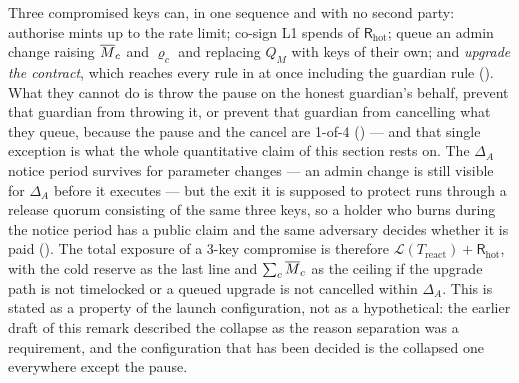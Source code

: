 \begin{remark}
\label{rem:sets-coincide}
Three compromised keys can, in one sequence and with no second party: authorise mints up to the rate
limit; co-sign L1 spends of $\mathsf{R}_{\mathrm{hot}}$; queue an admin change raising $\overline{M}_{c}$ and
$\varrho_c$ and replacing $Q_M$ with keys of their own; and \emph{upgrade the contract}, which
reaches every rule in  at once including the guardian rule
(). What they cannot do is throw the pause on the honest guardian's behalf,
prevent that guardian from throwing it, or prevent that guardian from cancelling what they queue,
because the pause and the cancel are 1-of-4 () --- and
that single exception is what the whole quantitative claim of this section rests on. The $\Delta_A$
notice period survives for parameter changes --- an admin change is still visible for $\Delta_A$
before it executes --- but the exit it is supposed to protect runs through a release quorum
consisting of the same three keys, so a holder who burns during the notice period has a public claim
and the same adversary decides whether it is paid (). The total exposure of a
3-key compromise is therefore $\mathcal{L}(T_{\mathrm{react}}) + \mathsf{R}_{\mathrm{hot}}$, with
the cold reserve as the last line and $\sum_c \overline{M}_{c}$ as the ceiling if the upgrade path is not
timelocked or a queued upgrade is not cancelled within $\Delta_A$. This is stated as a property of
the launch configuration, not as a hypothetical: the
earlier draft of this remark described the collapse as the reason separation was a requirement, and
the configuration that has been decided is the collapsed one everywhere except the pause.
\end{remark}

